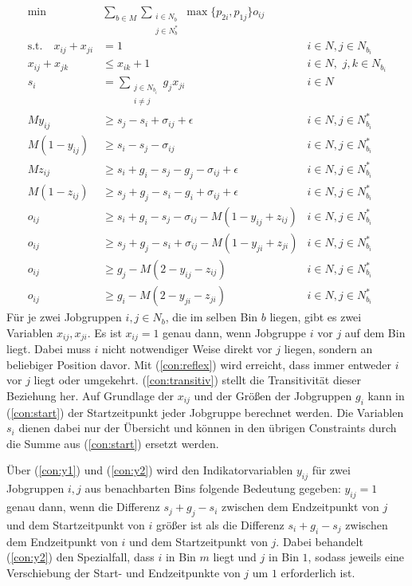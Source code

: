 \documentclass{article}
\begin{document}
\begin{align}
    \text{min}\quad &\sum_{b\in M}\sum_{\substack{i\in N_b\\j\in N_b^*}} 
            \max\{p_{2i},p_{1j}\}o_{ij} \label{objfunc}\\
    \text{s.t.} \quad x_{ij} + x_{ji} &= 1 &i\in N, j\in N_{b_i} 
            \label{con:reflex}\\
    x_{ij} + x_{jk} &\leq x_{ik} + 1 &i\in N,\,\, j,k\in N_{b_i} 
            \label{con:transitiv} \\
    s_i &= \sum_{\substack{j\in N_{b_i}\\i\neq j}} g_j x_{ji} &i\in N 
            \label{con:start} \\
    My_{ij} &\geq s_j - s_i + \sigma_{ij}+ \epsilon &i\in N, j\in N^*_{b_i} \\
    M(1-y_{ij}) &\geq s_i - s_j - \sigma_{ij} &i\in N, j\in N^*_{b_i} \\
    Mz_{ij} &\geq s_i + g_i - s_j - g_j - \sigma_{ij} + \epsilon &i\in N, j\in N^*_{b_i} \\
    M(1-z_{ij}) &\geq s_j + g_j- s_i - g_i + \sigma_{ij} + \epsilon &i\in N, j\in N^*_{b_i} \\
    o_{ij} &\geq s_i + g_i - s_j - \sigma_{ij} - M(1-y_{ij}+z_{ij}) &i\in N, j\in N^*_{b_i} \\
    o_{ij} &\geq s_j + g_j - s_i + \sigma_{ij} - M(1-y_{ji}+z_{ji}) &i\in N, j\in N^*_{b_i} \\
    o_{ij} &\geq g_j - M(2-y_{ij}-z_{ij}) &i\in N, j\in N^*_{b_i} \\
    o_{ij} &\geq g_i - M(2-y_{ji}-z_{ji}) &i\in N, j\in N^*_{b_i} 
\end{align}
%
Für je zwei Jobgruppen $i,j\in N_b$, die im selben Bin $b$ liegen, gibt es
zwei Variablen $x_{ij},x_{ji}$. Es ist $x_{ij}=1$ genau dann, wenn 
Jobgruppe $i$ vor $j$ auf dem Bin liegt. Dabei muss $i$ nicht notwendiger
Weise direkt vor $j$ liegen, sondern an beliebiger Position davor.
Mit (\ref{con:reflex}) wird erreicht, dass immer entweder $i$ vor $j$ liegt
oder umgekehrt. (\ref{con:transitiv}) stellt die Transitivität dieser Beziehung
her. Auf Grundlage der $x_{ij}$ und der Größen der Jobgruppen $g_i$ 
kann in (\ref{con:start}) der Startzeitpunkt jeder Jobgruppe berechnet werden.
Die Variablen $s_i$ dienen dabei nur der Übersicht und können in den übrigen 
Constraints durch die Summe aus (\ref{con:start}) ersetzt werden.

Über (\ref{con:y1}) und (\ref{con:y2}) wird den Indikatorvariablen $y_{ij}$ für
zwei Jobgruppen $i,j$ aus benachbarten Bins folgende
Bedeutung gegeben: $y_{ij}=1$ genau dann, wenn die Differenz $s_j+g_j-s_i$ zwischen dem
Endzeitpunkt von $j$ und dem Startzeitpunkt von $i$ größer ist als
die Differenz $s_i+g_i-s_j$ zwischen dem Endzeitpunkt von $i$ und dem Startzeitpunkt von $j$.
Dabei behandelt (\ref{con:y2}) den Spezialfall, dass $i$ in Bin $m$ liegt und
$j$ in Bin $1$, sodass jeweils eine Verschiebung der Start- und Endzeitpunkte
von $j$ um $1$ erforderlich ist.
\end{document}
